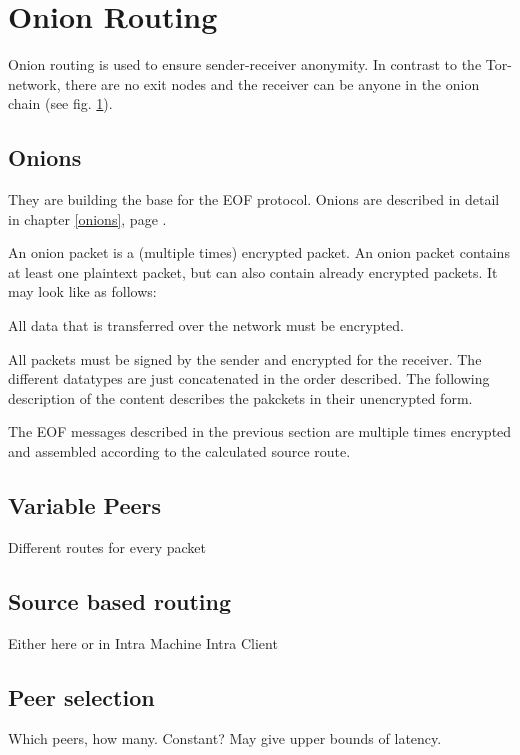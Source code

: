 \section{Onion Routing}
\label{onionrouting}
Onion routing is used to ensure sender-receiver anonymity. In contrast
to the Tor-network, there are no exit nodes and the receiver can be anyone
in the onion chain (see fig. \ref{onionrouting}).

\subsection{Onions}
\label{eofonion}

They are building the base for the EOF protocol.
Onions are described in detail in chapter \ref{onions}, page \pageref{onions}.

An onion packet is a (multiple times) encrypted packet.
An onion packet contains at least one plaintext packet, but can also contain
already encrypted packets. It may look like as follows:

All data that is transferred over the network must be encrypted.


All packets must be signed by the sender and encrypted for the receiver.
The different datatypes are just concatenated in the order described.
The following description of the content describes the pakckets
in their unencrypted form.


The EOF messages described in the previous section are multiple times
encrypted and assembled according to the calculated source route.

\subsection{Variable Peers}
Different routes for every packet

\subsection{Source based routing}
Either here or in Intra Machine Intra Client
\subsection{Peer selection}
Which peers, how many. Constant? May give upper bounds of latency.

